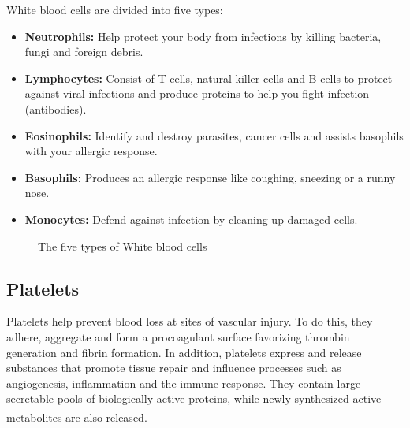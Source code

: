 White blood cells are divided into five types:

\begin{itemize}
  \item \textbf{Neutrophils:} Help protect your body from infections by killing bacteria, fungi and foreign debris.
  \item \textbf{Lymphocytes:} Consist of T cells, natural killer cells and B cells to protect against viral infections and produce proteins to help you fight infection (antibodies).
  \item \textbf{Eosinophils:} Identify and destroy parasites, cancer cells and assists basophils with your allergic response.
  \item \textbf{Basophils:} Produces an allergic response like coughing, sneezing or a runny nose.
  \item \textbf{Monocytes:} Defend against infection by cleaning up damaged cells.
\end{itemize}

\vspace{0.1in}

\begin{figure}[H]
\centering
  \vspace{-0.1in}
    \centerline{}
    \caption{The five types of White blood cells}
\end{figure}

\subsection{Platelets}

Platelets help prevent blood loss at sites of vascular injury. To do this, they adhere, aggregate and form a procoagulant surface favorizing thrombin generation and fibrin formation. In addition, platelets express and release substances that promote tissue repair and influence processes such as angiogenesis, inflammation and the immune response. They contain large secretable pools of biologically active proteins, while newly synthesized active metabolites are also released. \textsuperscript{\cite{nurden2008platelets}}

